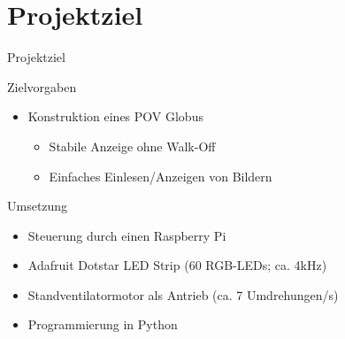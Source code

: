 \begin{frame}[label=title]{}
\titlepage
\end{frame}
\begin{frame}[label=title]{}
\tableofcontents
\end{frame}

\section{Projektziel}
\begin{frame}{Projektziel}
\begin{exampleblock}{Zielvorgaben}
\begin{itemize}
\item Konstruktion eines POV Globus
\begin{itemize}
\item Stabile Anzeige ohne Walk-Off
\item Einfaches Einlesen/Anzeigen von Bildern
\end{itemize}
\end{itemize}
\end{exampleblock}
\vspace{0.5cm}
\begin{exampleblock}{Umsetzung}
\begin{itemize}
\item Steuerung durch einen Raspberry Pi
\item Adafruit Dotstar LED Strip (60 RGB-LEDs; ca. 4kHz)
\item Standventilatormotor als Antrieb (ca. 7 Umdrehungen/s)
\item Programmierung in Python
\end{itemize}
\end{exampleblock}
\end{frame}

